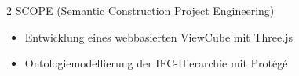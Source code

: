 \documentclass[10pt,a4paper,withhyper]{../altacv}
\begin{document}
\begin{paracol}{2}
  SCOPE (Semantic Construction Project Engineering)
  \begin{itemize}
    \item Entwicklung eines webbasierten ViewCube mit Three.js
    \item Ontologiemodellierung der IFC-Hierarchie mit Protégé
  \end{itemize}

  \vspace{1.0em}

  \divider



  \medskip


\end{paracol}
\end{document}
